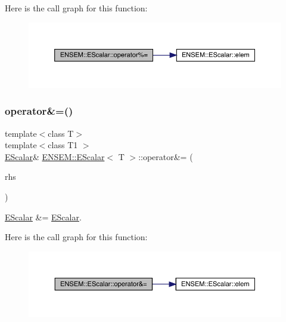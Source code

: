Here is the call graph for this function\+:
\nopagebreak
\begin{figure}[H]
\begin{center}
\leavevmode
\includegraphics[width=350pt]{d0/d82/classENSEM_1_1EScalar_ab4bd572c2f331fadf6914f406bce991f_cgraph}
\end{center}
\end{figure}
\mbox{\label{classENSEM_1_1EScalar_a4e16e2cecacdfefd6f01dcc360c6945b}} 
\subsubsection{\texorpdfstring{operator\&=()}{operator\&=()}\hspace{0.1cm}{\footnotesize\ttfamily [1/3]}}
{\footnotesize\ttfamily template$<$class T$>$ \\
template$<$class T1 $>$ \\
\mbox{\hyperlink{classENSEM_1_1EScalar}{E\+Scalar}}\& \mbox{\hyperlink{classENSEM_1_1EScalar}{E\+N\+S\+E\+M\+::\+E\+Scalar}}$<$ T $>$\+::operator\&= (\begin{DoxyParamCaption}\item[{const \mbox{\hyperlink{classENSEM_1_1EScalar}{E\+Scalar}}$<$ T1 $>$ \&}]{rhs }\end{DoxyParamCaption})\hspace{0.3cm}{\ttfamily [inline]}}



\mbox{\hyperlink{classENSEM_1_1EScalar}{E\+Scalar}} \&= \mbox{\hyperlink{classENSEM_1_1EScalar}{E\+Scalar}}. 

Here is the call graph for this function\+:
\nopagebreak
\begin{figure}[H]
\begin{center}
\leavevmode
\includegraphics[width=350pt]{d0/d82/classENSEM_1_1EScalar_a4e16e2cecacdfefd6f01dcc360c6945b_cgraph}
\end{center}
\end{figure}
\mbox{\label{classENSEM_1_1EScalar_a4e16e2cecacdfefd6f01dcc360c6945b}} 
